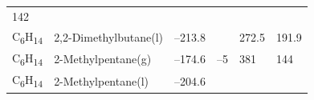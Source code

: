 \documentclass[
]{book}
\theoremstyle{definition}
\theoremstyle{definition}
\theoremstyle{definition}
\theoremstyle{remark}
\begin{document}
\begin{longtable}[]{@{}llllll@{}}
\begin{minipage}[t]{0.14\columnwidth}
142\strut
\end{minipage}\tabularnewline
\begin{minipage}[t]{0.07\columnwidth}\raggedright
C\textsubscript{6}H\textsubscript{14}\strut
\end{minipage} & \begin{minipage}[t]{0.17\columnwidth}\raggedright
2,2-Dimethylbutane(l)\strut
\end{minipage} & \begin{minipage}[t]{0.15\columnwidth}\raggedright
--213.8\strut
\end{minipage} & \begin{minipage}[t]{0.15\columnwidth}\raggedright
\strut
\end{minipage} & \begin{minipage}[t]{0.14\columnwidth}\raggedright
272.5\strut
\end{minipage} & \begin{minipage}[t]{0.14\columnwidth}\raggedright
191.9\strut
\end{minipage}\tabularnewline
\begin{minipage}[t]{0.07\columnwidth}\raggedright
C\textsubscript{6}H\textsubscript{14}\strut
\end{minipage} & \begin{minipage}[t]{0.17\columnwidth}\raggedright
2-Methylpentane(g)\strut
\end{minipage} & \begin{minipage}[t]{0.15\columnwidth}\raggedright
--174.6\strut
\end{minipage} & \begin{minipage}[t]{0.15\columnwidth}\raggedright
--5\strut
\end{minipage} & \begin{minipage}[t]{0.14\columnwidth}\raggedright
381\strut
\end{minipage} & \begin{minipage}[t]{0.14\columnwidth}\raggedright
144\strut
\end{minipage}\tabularnewline
\begin{minipage}[t]{0.07\columnwidth}\raggedright
C\textsubscript{6}H\textsubscript{14}\strut
\end{minipage} & \begin{minipage}[t]{0.17\columnwidth}\raggedright
2-Methylpentane(l)\strut
\end{minipage} & \begin{minipage}[t]{0.15\columnwidth}\raggedright
--204.6\strut
\end{minipage} & \begin{minipage}[t]{0.15\columnwidth}\raggedright

\end{minipage}
\end{longtable}
\end{document}
